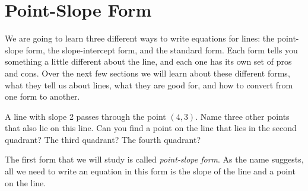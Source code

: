 \section{Point-Slope Form}
\label{pointslopeform}

We are going to learn three different ways to write equations for lines: the point-slope form, the slope-intercept form, and the standard form. Each form tells you something a little different about the line, and each one has its own set of pros and cons. Over the next few sections we will learn about these different forms, what they tell us about lines, what they are good for, and how to convert from one form to another.

\begin{boxedexplore}
\end{boxedexplore}

\begin{boxedexplore}
A line with slope 2 passes through the point $(4,3)$. Name three other points that also lie on this line. Can you find a point on the line that lies in the second quadrant? The third quadrant? The fourth quadrant?
\end{boxedexplore} %

The first form that we will study is called \textit{point-slope form}. As the name suggests, all we need to write an equation in this form is the slope of the line and a point on the line.


